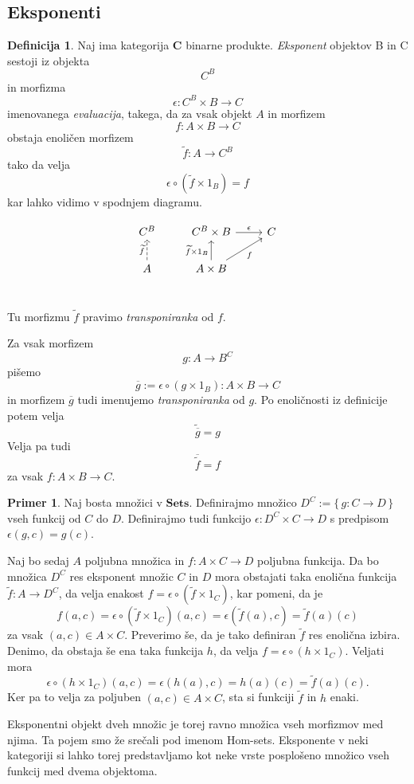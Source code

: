 \documentclass[12pt,a4paper]{book}
\theoremstyle{definition}
\newtheorem{definicija}{Definicija}[chapter]
\theoremstyle{plain}
\theoremstyle{definition}
\newtheorem{primer}{Primer}[section]
\theoremstyle{remark}
\newcommand{\cat}[1]{\textbf{#1}}
\renewcommand{\set}[1]{\{\,#1\,\}}
\begin{document}
\subsection{Eksponenti}

\begin{definicija}
Naj ima kategorija $\cat{C}$ binarne produkte. \textit{Eksponent} objektov B in C sestoji iz objekta 
$$C^B$$
in morfizma
$$\epsilon : C^B \times B \to C$$ imenovanega \textit{evaluacija}, takega, da za vsak objekt $A$ in morfizem 
$$f : A \times B \to C$$
obstaja enoličen morfizem 
$$\widetilde{f} : A \to C^B$$
tako da velja
$$\epsilon \circ (\widetilde{f} \times 1_B) = f$$
kar lahko vidimo v spodnjem diagramu.

$$\begin{tikzcd}
C^B &  C^B \times B \ar[r, "\epsilon"] & C \\
A \ar[u, dashed, "\widetilde{f}"] &  A \times B \ar[u, "\widetilde{f} \times 1_B"] \ar[ur, "f"'] & \\
\end{tikzcd}$$

Tu morfizmu $\widetilde{f}$ pravimo \textit{transponiranka} od $f$.

\end{definicija}

Za vsak morfizem $$g : A \to B^C$$ pišemo
$$ \overline{g} := \epsilon \circ (g \times 1_B) : A \times B \to C$$
in morfizem $\overline{g}$ tudi imenujemo \textit{transponiranka} od $g$. Po enoličnosti iz definicije potem velja
$$\widetilde{\overline{g}} = g$$
Velja pa tudi
$$\overline{\widetilde{f}} = f$$
za vsak $f : A \times B \to C$.

\begin{primer}
Naj bosta množici v $\cat{Sets}$. Definirajmo množico $D^C := \set{g : C \to D}$ vseh funkcij od $C$ do $D$. Definirajmo tudi funkcijo $\epsilon : D^C \times C \to D$ s predpisom $\epsilon(g,c) = g(c)$.

Naj bo sedaj $A$ poljubna množica in $f : A \times C \to D$ poljubna funkcija. Da bo množica $D^C$ res eksponent množic $C$ in $D$ mora obstajati taka enolična funkcija $\widetilde{f} : A \to D^C$, da velja enakost $f = \epsilon \circ (\widetilde{f} \times 1_C)$, kar pomeni, da je
$$f(a,c) = \epsilon \circ (\widetilde{f} \times 1_C)(a,c) = \epsilon(\widetilde{f}(a),c) = \widetilde{f}(a)(c)$$
za vsak $(a,c) \in A \times C$. Preverimo še, da je tako definiran $\widetilde{f}$ res enolična izbira. Denimo, da obstaja še ena taka funkcija $h$, da velja $f = \epsilon \circ (h \times 1_C)$. Veljati mora
$$\epsilon \circ (h \times 1_C)(a,c) = \epsilon(h(a),c) = h(a)(c) = \widetilde{f}(a)(c).$$
Ker pa to velja za poljuben $(a,c) \in A \times C$, sta si funkciji $\widetilde{f}$ in $h$ enaki.

Eksponentni objekt dveh množic je torej ravno množica vseh morfizmov med njima. Ta pojem smo že srečali pod imenom Hom-sets.
Eksponente v neki kategoriji si lahko torej predstavljamo kot neke vrste posplošeno množico vseh funkcij med dvema objektoma. 
\end{primer}
\end{document}
